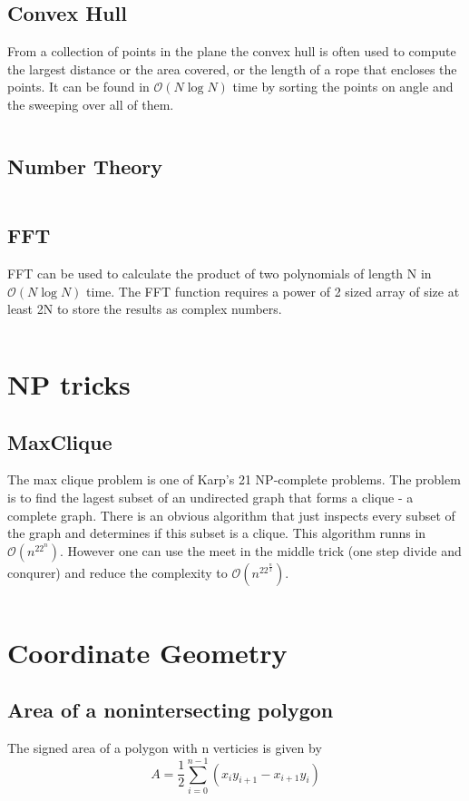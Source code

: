 \documentclass[8pt,a4paper,landscape,oneside]{amsart}
\newcommand{\codej}[1]{\inputminted[fontsize=\large,tabsize=2,baselinestretch=1]{java}{code/#1}}
\newcommand{\codep}[1]{\inputminted[fontsize=\large,tabsize=2,baselinestretch=1]{py}{code/#1}}
\newcommand{\bigO}{\mathcal{O}}
\begin{document}
\begin{multicols*}{2}
\begin{large}
    \subsection{Convex Hull}
        From a collection of points in the plane the convex hull is often used to compute the largest distance or the area covered, or the length of a rope that encloses the points. It can be found in $\bigO (N\log{N})$ time by sorting the points on angle and the sweeping over all of them.
        \codep{Etc/convexhull.py}
    \subsection{Number Theory}
        \codep{Etc/numbertheory.py}
    \subsection{FFT}
        FFT can be used to calculate the product of two polynomials of length N in $\bigO(N\log N)$ time. The FFT function requires a power of 2 sized array of size at least 2N to store the results as complex numbers.
        \codep{Etc/fft.py}

\section{NP tricks}
    \subsection{MaxClique}
        The max clique problem is one of Karp's 21 NP-complete problems. The problem is to find the lagest subset of an undirected graph that forms a clique - a complete graph. There is an obvious algorithm that just inspects every subset of the graph and determines if this subset is a clique. This algorithm runns in $\bigO(n^22^n)$. However one can use the meet in the middle trick (one step divide and conqurer) and reduce the complexity to $\bigO(n^22^{\frac{n}{2}})$.
        \codej{NP/MaxClique.java}
\section{Coordinate Geometry}
    \subsection{Area of a nonintersecting polygon}
        The signed area of a polygon with n verticies is given by 
        $$A = \frac{1}{2}\sum_{i=0}^{n-1}(x_iy_{i+1} - x_{i+1}y_i)$$

\end{large}
\end{multicols*}
\end{document}

